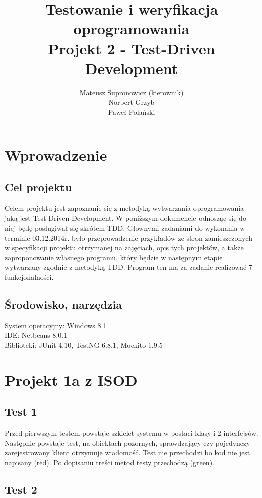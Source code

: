 \documentclass[a4paper,12pt,twoside]{article}
\title{Testowanie i weryfikacja oprogramowania \\ Projekt 2 - Test-Driven Development}
\author{Mateusz Supronowicz (kierownik) \\ Norbert Grzyb \\ Paweł Polański}
\begin{document}
\maketitle

\section{Wprowadzenie}

\subsection{Cel projektu}

Celem projektu jest zapoznanie się z metodyką wytwarzania oprogramowania jaką jest Test-Driven Development.
W poniższym dokumencie odnosząc się do niej będę posługiwał się skrótem TDD. Głownymi zadaniami do
wykonania w terminie 03.12.2014r. było przeprowadzenie przykładów ze stron zamieszczonych w specyfikacji
projektu otrzymanej na zajęciach, opis tych projektów, a także zaproponowanie własnego programu, który
będzie w następnym etapie wytwarzany zgodnie z metodyką TDD. Program ten ma za zadanie realizować
7 funkcjonalności.

\subsection{Środowisko, narzędzia}

System operacyjny: Windows 8.1\\
IDE: Netbeans 8.0.1\\
Biblioteki: JUnit 4.10, TestNG 6.8.1, Mockito 1.9.5

\section{Projekt 1a z ISOD}

\subsection{Test 1}

Przed pierwszym testem powstaje szkielet systemu w postaci klasy i 2 interfejsów.
Następnie powstaje test, na obiektach pozornych, sprawdzający czy pojedynczy zarejestrowany klient otrzymuje wiadomość.
Test nie przechodzi bo kod nie jest napisany (red). Po dopisaniu treści metod testy przechodzą (green).

\subsection{Test 2}
\end{document}
